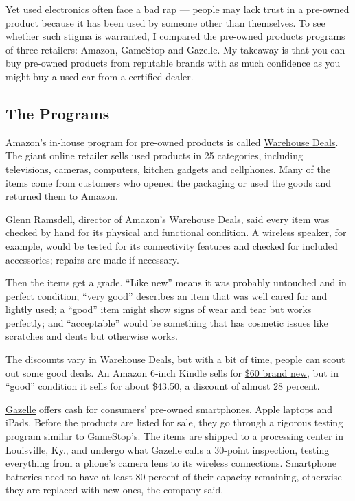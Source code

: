 Yet used electronics often face a bad rap --- people may lack trust in a
pre-owned product because it has been used by someone other than
themselves. To see whether such stigma is warranted, I compared the
pre-owned products programs of three retailers: Amazon, GameStop and
Gazelle. My takeaway is that you can buy pre-owned products from
reputable brands with as much confidence as you might buy a used car
from a certified dealer.

\hypertarget{the-programs}{%
\subsection{The Programs}\label{the-programs}}

Amazon's in-house program for pre-owned products is called
\href{http://www.warehousedeals.com}{Warehouse Deals}. The giant online
retailer sells used products in 25 categories, including televisions,
cameras, computers, kitchen gadgets and cellphones. Many of the items
come from customers who opened the packaging or used the goods and
returned them to Amazon.

Glenn Ramsdell, director of Amazon's Warehouse Deals, said every item
was checked by hand for its physical and functional condition. A
wireless speaker, for example, would be tested for its connectivity
features and checked for included accessories; repairs are made if
necessary.

Then the items get a grade. ``Like new'' means it was probably untouched
and in perfect condition; ``very good'' describes an item that was well
cared for and lightly used; a ``good'' item might show signs of wear and
tear but works perfectly; and ``acceptable'' would be something that has
cosmetic issues like scratches and dents but otherwise works.

The discounts vary in Warehouse Deals, but with a bit of time, people
can scout out some good deals. An Amazon 6-inch Kindle sells for
\href{http://www.amazon.com/Kindle-Glare-Free-Touchscreen-Display-Wi-Fi/dp/B00I15SB16}{\$60
brand new}, but in ``good'' condition it sells for about \$43.50, a
discount of almost 28 percent.

\href{http://www.gazelle.com}{Gazelle} offers cash for consumers'
pre-owned smartphones, Apple laptops and iPads. Before the products are
listed for sale, they go through a rigorous testing program similar to
GameStop's. The items are shipped to a processing center in Louisville,
Ky., and undergo what Gazelle calls a 30-point inspection, testing
everything from a phone's camera lens to its wireless connections.
Smartphone batteries need to have at least 80 percent of their capacity
remaining, otherwise they are replaced with new ones, the company said.

